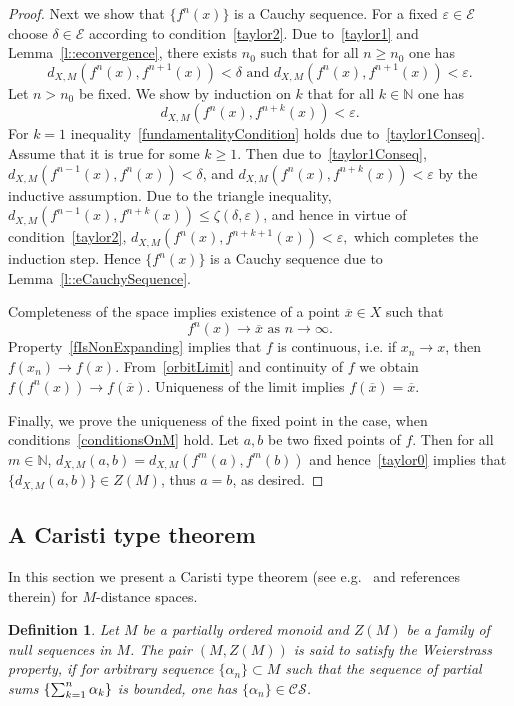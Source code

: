 \documentclass[12pt]{amsart}          %
\newtheorem{definition}{Definition}
\newcommand{\NN}{\mathbb N}
\newcommand{\EE}{\mathcal{E}}
\begin{document}
\begin{proof}
Next we show that  $\{f^n(x)\}$ is a Cauchy sequence.  For a fixed $\varepsilon\in \EE$ choose $\delta\in \EE$ according to condition~\eqref{taylor2}. Due to~\eqref{taylor1} and Lemma~\ref{l::econvergence}, there exists  $n_0$ such that for all $n\ge n_0$ one has
\begin{equation}\label{taylor1Conseq}
d_{X,M}(f^n(x),f^{n+1}(x))<\delta \text{ and } d_{X,M}(f^n(x),f^{n+1}(x))<\varepsilon.  
\end{equation}
Let $n> n_0$ be fixed. We show by induction on $k$ that for all $k\in \NN$  one has
\begin{equation}\label{fundamentalityCondition}
d_{X,M}(f^n(x),f^{n+k}(x))<\varepsilon.
\end{equation}
For $k=1$ inequality~\eqref{fundamentalityCondition} holds due to~\eqref{taylor1Conseq}. Assume that it is true for some $k \geq 1$. Then due to~\eqref{taylor1Conseq}, $d_{X,M}(f^{n-1}(x),f^{n}(x))<\delta$, and $d_{X,M}(f^n(x),f^{n+k}(x))<\varepsilon$ by the inductive assumption. Due to the triangle inequality, $d_{X,M}(f^{n-1}(x),f^{n+k}(x))\leq \zeta(\delta,\varepsilon)$, and hence in virtue of condition~\eqref{taylor2}, 
$
d_{X,M}(f^n(x),f^{n+k+1}(x))<\varepsilon,
$
which completes the induction step. Hence $\{f^n(x)\}$ is a Cauchy sequence due to Lemma~\ref{l::eCauchySequence}.

Completeness of the space implies existence of a point $\overline{x}\in X$ such that 
\begin{equation}\label{orbitLimit}
    f^n(x)\to\overline{x} \text{ as } n\to\infty.
\end{equation}
Property~\eqref{fIsNonExpanding} implies that $f$ is continuous, i.e. if $x_n\to x$, then $f(x_n)\to f(x)$. 
From~\eqref{orbitLimit} and continuity of $f$ we obtain $f(f^n(x))\to f(\overline{x})$. Uniqueness of the limit implies
$f(\overline{x})=\overline{x}$.

Finally, we prove the uniqueness of the fixed point  in the case, when conditions~\ref{conditionsOnM} hold. Let $a,b$ be two fixed points of $f$. Then for all $m\in\NN$,  $d_{X,M}(a,b) = d_{X,M}(f^m(a),f^m(b))$ and hence~\eqref{taylor0} implies that $\{d_{X,M}(a,b)\}\in Z(M)$, thus $a=b$, as desired.
\end{proof}

\subsection{A Caristi type theorem}
In this section we present a Caristi type theorem (see e.g.~\cite{kirk_shahzad} and references therein) for $M$-distance spaces.
\begin{definition}
Let $M$ be a partially ordered monoid and $Z(M)$ be a family of null sequences  in $M$. The pair $(M,Z(M))$ is said to satisfy the Weierstrass property, if for arbitrary sequence $\{\alpha_n\}\subset M$ such that the sequence of partial sums $\left\{\sum\nolimits\nolimits_{k=1}^n \alpha_k\right\}$ is bounded, one has $\{\alpha_n\}\in \mathcal{CS}$.
\end{definition}
\end{document}
